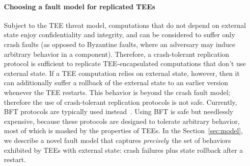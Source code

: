 \paragraph{Choosing a fault model for replicated \acp{TEE}}

Subject to the \ac{TEE} threat model, computations that do not depend on
external state enjoy confidentiality and integrity, and can be
considered to suffer only crash faults (as opposed to Byzantine
faults, where an adversary may induce arbitrary behavior in a
component). Therefore, a crash-tolerant replication protocol is sufficient
to replicate \ac{TEE}-encapsulated computations that don't use external
state.  If a \ac{TEE} computation relies on external state, however, then
it can additionally suffer a rollback of the external state to an
earlier version whenever the \ac{TEE} restarts.  This behavior is beyond
the crash fault model; therefore the use of crash-tolerant replication
protocols is not safe. Currently, \ac{BFT} protocols are typically used
instead~\cite{teechain,rote}.  Using \ac{BFT} is safe but needlessly
expensive, because these protocols are designed to tolerate arbitrary
behavior, most of which is masked by the properties of \acp{TEE}.
In the Section~\ref{sec:model}, we describe a novel fault model that
captures {\em precisely}\ the set of behaviors exhibited by \acp{TEE} with
external state: crash failures plus state rollback after a restart.

